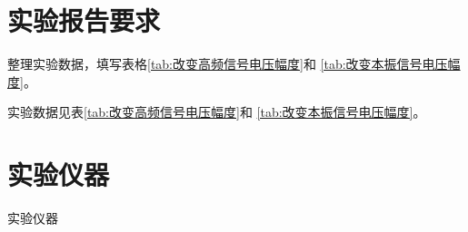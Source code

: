 \documentclass[../main]{subfiles}
\begin{document}
\section{实验报告要求}%
\label{sec:\arabic{chapter}实验报告要求}

\begin{Exercise}

	整理实验数据，填写表格\ref{tab:改变高频信号电压幅度}和
	\ref{tab:改变本振信号电压幅度}。

\end{Exercise}

\begin{Answer}

	实验数据见表\ref{tab:改变高频信号电压幅度}和
	\ref{tab:改变本振信号电压幅度}。

\end{Answer}

\section{实验仪器}%
\label{sec:\arabic{chapter}实验仪器}

\begin{table}[htbp]
	\centering
	\caption{实验仪器}
	\label{tab:\arabic{chapter}实验仪器}
\end{table}
\end{document}
